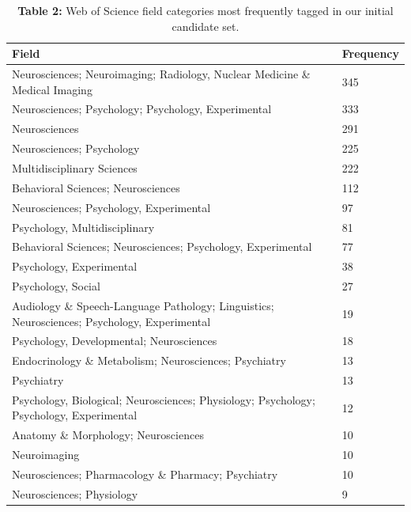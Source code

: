 \documentclass[
  english,
  man,floatsintext]{apa6}
\begin{document}
\begin{table}[tbp]

\begin{center}
\begin{threeparttable}

\caption{\label{tab:tab2}\textbf{Table 2:} Web of Science field categories most frequently tagged in our initial candidate set.}

\small{

\begin{tabular}{m{11cm}m{1.5cm}}
\toprule
Field & \multicolumn{1}{c}{Frequency}\\
\midrule
Neurosciences; Neuroimaging; Radiology, Nuclear Medicine \& Medical Imaging & 345\\
Neurosciences; Psychology; Psychology, Experimental & 333\\
Neurosciences & 291\\
Neurosciences; Psychology & 225\\
Multidisciplinary Sciences & 222\\
Behavioral Sciences; Neurosciences & 112\\
Neurosciences; Psychology, Experimental & 97\\
Psychology, Multidisciplinary & 81\\
Behavioral Sciences; Neurosciences; Psychology, Experimental & 77\\
Psychology, Experimental & 38\\
Psychology, Social & 27\\
Audiology \& Speech-Language Pathology; Linguistics; Neurosciences; Psychology, Experimental & 19\\
Psychology, Developmental; Neurosciences & 18\\
Endocrinology \& Metabolism; Neurosciences; Psychiatry & 13\\
Psychiatry & 13\\
Psychology, Biological; Neurosciences; Physiology; Psychology; Psychology, Experimental & 12\\
Anatomy \& Morphology; Neurosciences & 10\\
Neuroimaging & 10\\
Neurosciences; Pharmacology \& Pharmacy; Psychiatry & 10\\
Neurosciences; Physiology & 9\\
\bottomrule
\end{tabular}

}

\end{threeparttable}
\end{center}

\end{table}
\end{document}
